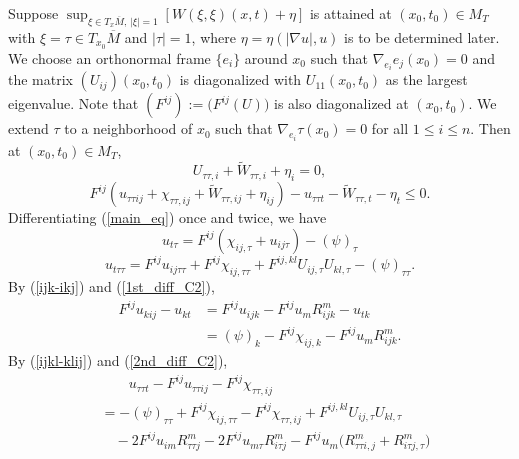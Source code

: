\documentclass[12pt]{amsart}
\theoremstyle{definition}
\theoremstyle{remark}
\numberwithin{equation}{section}
\begin{document}
Suppose $\sup_{\xi \in T_x \overline{M},\, |\xi|=1} \left[W(\xi , \xi)(x, t) + \eta\right] $ is attained at $(x_0, t_0) \in M_T$ with $\xi = \tau \in T_{x_0} \overline{M}$ and $|\tau| = 1$, where $\eta = \eta (|\nabla u|, u)$ is to be determined later.
We choose an orthonormal frame $\{e_i\}$ around $x_0$ such that $\nabla_{e_i} e_j (x_0) = 0$ and the matrix $\left( U_{ij} \right)(x_0, t_0)$ is diagonalized with $U_{11}(x_0, t_0)$ as the largest eigenvalue. Note that $(F^{ij}) := \big(F^{ij}(U)\big)$ is also diagonalized at $(x_0, t_0)$. We extend $\tau$ to a neighborhood of $x_0$ such that $\nabla_{e_i} \tau (x_0) = 0$ for all $1 \leq i \leq n$. Then at $(x_0, t_0) \in M_T$,
\begin{equation}
U_{\tau\tau, i} + \tilde{W}_{\tau\tau, i} + \eta_i = 0,
\end{equation}
\begin{equation}\label{C2_CrPt_2nd_order}
F^{ij} \left( u_{\tau\tau ij} + \chi_{\tau\tau, ij} + \tilde{W}_{\tau\tau, ij} + \eta_{ij} \right) - u_{\tau\tau t} - \tilde{W}_{\tau\tau, t} - \eta_t \leq 0.
\end{equation}
Differentiating (\ref{main_eq}) once and twice, we have
\begin{equation}\label{1st_diff_C2}
u_{t\tau} = F^{ij} (\chi_{ij,\tau} + u_{ij\tau}) - (\psi)_\tau
\end{equation}
\begin{equation}\label{2nd_diff_C2}
u_{t\tau\tau} = F^{ij} u_{ij\tau\tau} + F^{ij} \chi_{ij,\tau\tau} + F^{ij,kl} U_{ij,\tau} U_{kl,\tau} - (\psi)_{\tau\tau}.
\end{equation}
By (\ref{ijk-ikj}) and (\ref{1st_diff_C2}),
\begin{equation}\label{C2_ineq_7}
\begin{aligned}
F^{ij} u_{kij} - u_{kt} &= F^{ij} u_{ijk} - F^{ij} u_m R^m_{ijk} - u_{tk}\\
&= (\psi)_k - F^{ij} \chi_{ij,k} - F^{ij} u_m R^m_{ijk}.
\end{aligned}
\end{equation}
By (\ref{ijkl-klij}) and (\ref{2nd_diff_C2}),
\begin{equation}\label{C2_ineq_1}
\begin{aligned}
& \qquad u_{\tau\tau t} - F^{ij} u_{\tau\tau ij} - F^{ij} \chi_{\tau\tau, ij}\\
&= -(\psi)_{\tau\tau} + F^{ij} \chi_{ij,\tau\tau} - F^{ij} \chi_{\tau\tau, ij} + F^{ij,kl} U_{ij,\tau} U_{kl,\tau} \\
& \quad -2F^{ij} u_{im} R^m_{\tau\tau j} - 2F^{ij} u_{m\tau} R^m_{i\tau j} - F^{ij} u_m \big( R^m_{\tau\tau i,j} + R^m_{i\tau j,\tau} \big)
\end{aligned}
\end{equation}
\end{document}
